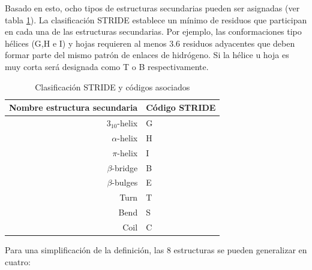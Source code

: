Basado en esto, ocho tipos de estructuras secundarias pueden ser asignadas (ver tabla \ref{table:dssp}). La clasificación STRIDE establece un mínimo de residuos que participan en cada una de las estructuras secundarias. Por ejemplo, las conformaciones tipo hélices (G,H e I) y hojas requieren al menos 3.6 residuos adyacentes que deben formar parte del mismo patrón de enlaces de hidrógeno. Si la hélice u hoja es muy corta será designada como T o B respectivamente.

\begin{table}[h]
    \caption{Clasificaci\'on STRIDE y códigos asociados}
	\centering
	\begin{tabular}{|r|l|}
		\hline
		\textbf{Nombre estructura secundaria} & \textbf{Código STRIDE} \\ \hline
		$3_{10}$-helix 	& G		\\		
		$\alpha$-helix 	& H		\\ 		
		$\pi$-helix 	& I		\\  	
		$\beta$-bridge 	& B		\\ 		
		$\beta$-bulges 	& E		\\ 		
		Turn 			& T		\\		
		Bend 			& S		\\	
		Coil 			& C		\\		\hline
	\end{tabular}
	\label{table:dssp}
\end{table}


Para una simplificación de la definición, las 8 estructuras se pueden generalizar en cuatro:


